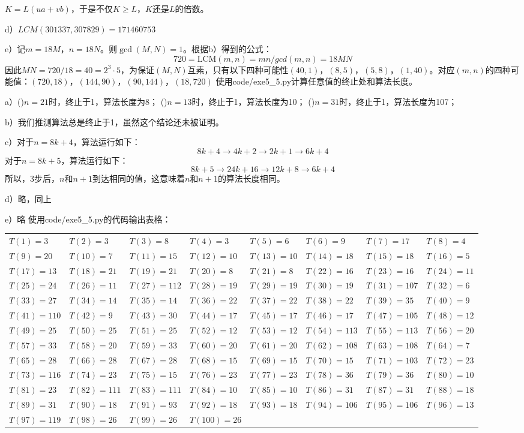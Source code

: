 $K=L(ua+vb)$，于是不仅$K\ge L$，$K$还是$L$的倍数。\par
d）$LCM(301337, 307829) = 171460753$\par
e）记$m=18M$，$n=18N$。则$\gcd(M, N)=1$。根据b）得到的公式：
\[720=\mathrm{LCM}(m,n)=mn/gcd(m,n)=18MN\]
因此$MN=720/18=40=2^3\cdot 5$，为保证$(M,N)$互素，只有以下四种可能性$(40,1)$，$(8,5)$，$(5,8)$，$(1,40)$。对应$(m,n)$的四种可能值：$(720,18)$，$(144,90)$，$(90,144)$，$(18,720)$
%
\exercise 使用code/exe5\_5.py计算任意值的终止处和算法长度。\par
a）()$n=21$时，终止于1，算法长度为8；
()$n=13$时，终止于1，算法长度为10；
()$n=31$时，终止于1，算法长度为107；\par
b）我们推测算法总是终止于1，虽然这个结论还未被证明。\par
c）\proof 对于$n=8k+4$，算法运行如下：
\[8k+4\rightarrow4k+2\rightarrow2k+1\rightarrow6k+4\]
对于$n=8k+5$，算法运行如下：
\[8k+5\rightarrow24k+16\rightarrow12k+8\rightarrow6k+4\]
所以，3步后，$n$和$n+1$到达相同的值，这意味着$n$和$n+1$的算法长度相同。\par
d）略，同上 \par
e）略
%
\exercise 使用code/exe5\_5.py的代码输出表格：
\begin{center}
\tiny
\begin{tabular}{*{8}{l}}
    $T(1)=3$ & $T(2)=3$ & $T(3)=8$ & $T(4)=3$ & $T(5)=6$ & $T(6)=9$ & $T(7)=17$ & $T(8)=4$\\
    $T(9)=20$ & $T(10)=7$ & $T(11)=15$ & $T(12)=10$ & $T(13)=10$ & $T(14)=18$ & $T(15)=18$ & $T(16)=5$\\
    $T(17)=13$ & $T(18)=21$ & $T(19)=21$ & $T(20)=8$ & $T(21)=8$ & $T(22)=16$ & $T(23)=16$ & $T(24)=11$\\
    $T(25)=24$ & $T(26)=11$ & $T(27)=112$ & $T(28)=19$ & $T(29)=19$ & $T(30)=19$ & $T(31)=107$ & $T(32)=6$\\
    $T(33)=27$ & $T(34)=14$ & $T(35)=14$ & $T(36)=22$ & $T(37)=22$ & $T(38)=22$ & $T(39)=35$ & $T(40)=9$\\
    $T(41)=110$ & $T(42)=9$ & $T(43)=30$ & $T(44)=17$ & $T(45)=17$ & $T(46)=17$ & $T(47)=105$ & $T(48)=12$\\
    $T(49)=25$ & $T(50)=25$ & $T(51)=25$ & $T(52)=12$ & $T(53)=12$ & $T(54)=113$ & $T(55)=113$ & $T(56)=20$\\
    $T(57)=33$ & $T(58)=20$ & $T(59)=33$ & $T(60)=20$ & $T(61)=20$ & $T(62)=108$ & $T(63)=108$ & $T(64)=7$\\
    $T(65)=28$ & $T(66)=28$ & $T(67)=28$ & $T(68)=15$ & $T(69)=15$ & $T(70)=15$ & $T(71)=103$ & $T(72)=23$\\
    $T(73)=116$ & $T(74)=23$ & $T(75)=15$ & $T(76)=23$ & $T(77)=23$ & $T(78)=36$ & $T(79)=36$ & $T(80)=10$\\
    $T(81)=23$ & $T(82)=111$ & $T(83)=111$ & $T(84)=10$ & $T(85)=10$ & $T(86)=31$ & $T(87)=31$ & $T(88)=18$\\
    $T(89)=31$ & $T(90)=18$ & $T(91)=93$ & $T(92)=18$ & $T(93)=18$ & $T(94)=106$ & $T(95)=106$ & $T(96)=13$\\
    $T(97)=119$ & $T(98)=26$ & $T(99)=26$ & $T(100)=26$\\
\end{tabular}
\end{center}
